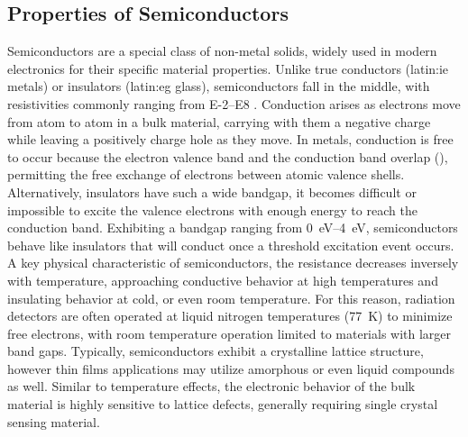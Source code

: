 \documentclass[../../../main.tex]{subfiles}
\begin{document}
%
    \subsection{Properties of Semiconductors}%
    \label{sec:chapter-2:semiconductor-detectors:properties-of-semiconductors}%
    Semiconductors are a special class of non-metal solids, widely used in modern electronics for their specific material properties.
    Unlike true conductors (\gls{latin:ie} metals) or insulators (\gls{latin:eg} glass), semiconductors fall in the middle, with resistivities commonly ranging from \SIrange{E-2}{E8}{\ohmcm} \cite{book:Owens_2016}.
    Conduction arises as electrons move from atom to atom in a bulk material, carrying with them a negative charge while leaving a positively charge hole as they move.
    In metals, conduction is free to occur because the electron valence band and the conduction band overlap (), permitting the free exchange of electrons between atomic valence shells.
    Alternatively, insulators have such a wide bandgap, it becomes difficult or impossible to excite the valence electrons with enough energy to reach the conduction band.
    Exhibiting a bandgap  ranging from \SIrange{0}{4}{\electronvolt}, semiconductors behave like insulators that will conduct once a threshold excitation event occurs.
    A key physical characteristic of semiconductors, the resistance decreases inversely with temperature, approaching conductive behavior at high temperatures and insulating behavior at cold, or even room temperature.
    For this reason, radiation detectors are often operated at liquid nitrogen temperatures (\SI{77}{\kelvin}) to minimize free electrons, with room temperature operation limited to materials with larger band gaps.
    Typically, semiconductors exhibit a crystalline lattice structure, however thin films applications may utilize amorphous or even liquid compounds as well.
    Similar to temperature effects, the electronic behavior of the bulk material is highly sensitive to lattice defects, generally requiring single crystal sensing material.
\end{document}
